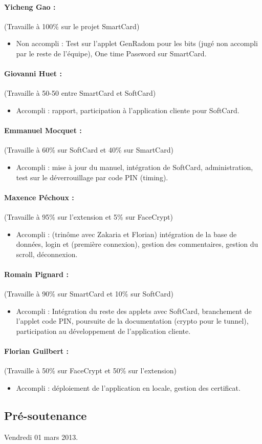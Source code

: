 \documentclass[a4paper,10pt]{article}
\begin{document}
\paragraph{Yicheng Gao :} (Travaille à 100\% sur le projet SmartCard)
\begin{itemize}
\item Non accompli : Test sur l'applet GenRadom pour les bits (jugé non 
        accompli par le reste de l'équipe), One time Password sur SmartCard.
\end{itemize}

\paragraph{Giovanni Huet : } (Travaille à 50-50 entre SmartCard et SoftCard) 
\begin{itemize}
    \item Accompli : rapport, participation à l'application cliente pour SoftCard.
\end{itemize}

\paragraph{Emmanuel Mocquet : } (Travaille à 60\% sur SoftCard et 40\% sur SmartCard)
\begin{itemize}
    \item Accompli : mise à jour du manuel, intégration de SoftCard,
        administration, test sur le déverrouillage par code PIN (timing).
\end{itemize}

\paragraph{Maxence Péchoux : } (Travaille à 95\% sur l'extension et 5\% sur FaceCrypt)
\begin{itemize}
\item Accompli : (trinôme avec Zakaria et Florian) intégration de la 
    base de données, login et (première connexion), gestion des commentaires,
    gestion du scroll, déconnexion.
\end{itemize}

\paragraph{Romain Pignard : } (Travaille à 90\% sur SmartCard et 10\% sur SoftCard)
\begin{itemize}
    \item Accompli : Intégration du reste des applets avec SoftCard, 
   branchement de l'applet code PIN, poursuite de la documentation (crypto pour
           le tunnel), participation au développement de l'application cliente.
\end{itemize}

\paragraph{Florian Guilbert : } (Travaille à 50\% sur FaceCrypt et 50\% sur l'extension)
\begin{itemize}
    \item Accompli : déploiement de l'application en locale, gestion des 
    certificat.
\end{itemize}


\subsection*{Pré-soutenance}
Vendredi 01 mars 2013.
\end{document}
